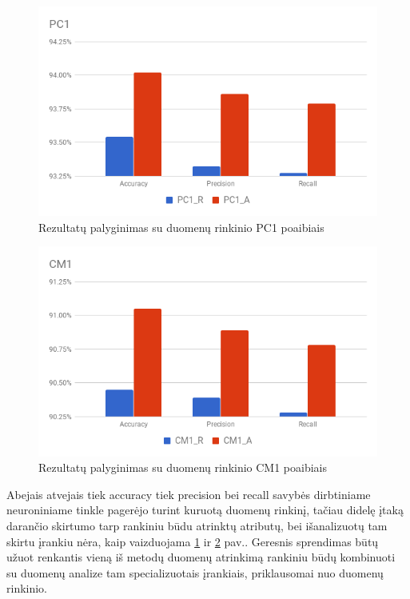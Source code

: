 \documentclass{VUMIFPSbakalaurinis}
\begin{document}
\begin{figure}[H]
    \centering
    \includegraphics[scale=0.5]{img/chart-3}
    \caption{Rezultatų palyginimas su duomenų rinkinio PC1 poaibiais}
    \label{img:chart3}
\end{figure}

\begin{figure}[H]
    \centering
    \includegraphics[scale=0.5]{img/chart-4}
    \caption{Rezultatų palyginimas su duomenų rinkinio CM1 poaibiais}
    \label{img:chart4}
\end{figure}

Abejais atvejais tiek accuracy tiek precision bei recall savybės dirbtiniame neuroniniame tinkle pagerėjo turint kuruotą duomenų rinkinį, tačiau didelę įtaką darančio skirtumo tarp rankiniu būdu atrinktų atributų, bei išanalizuotų tam skirtu įrankiu nėra, kaip vaizduojama \ref{img:chart3} ir \ref{img:chart4} pav.. Geresnis sprendimas būtų užuot renkantis vieną iš metodų duomenų atrinkimą rankiniu būdų kombinuoti su duomenų analize tam specializuotais įrankiais, priklausomai nuo duomenų rinkinio. 
\end{document}
